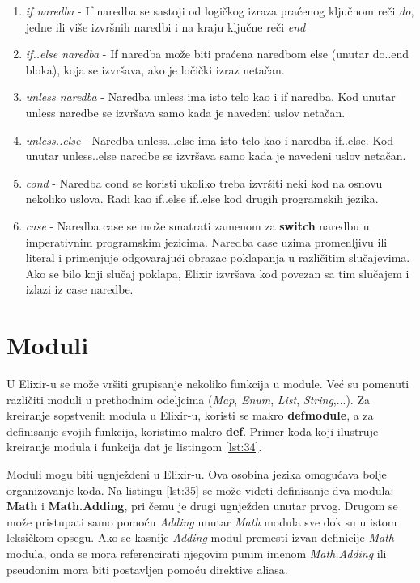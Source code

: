 \documentclass[12pt,oneside]{memoir}
\begin{document}
\begin{enumerate}
\itemsep0em 
    \item{\textit{if naredba} - If naredba se sastoji od logičkog izraza praćenog ključnom reči \textit{do}, jedne ili više izvršnih naredbi i na kraju ključne reči \textit{end}}
    \item{\textit{if..else naredba} - If naredba može biti praćena naredbom else (unutar do..end bloka), koja se izvršava, ako je ločički izraz netačan.}
    \item{\textit{unless naredba} - Naredba unless ima isto telo kao i if naredba. Kod unutar unless naredbe se izvršava samo kada je navedeni uslov netačan.}
    \item{\textit{unless..else} - Naredba unless...else ima isto telo kao i naredba if..else. Kod unutar unless..else naredbe se izvršava samo kada je navedeni uslov netačan.}
    \item{\textit{cond} - Naredba cond se koristi ukoliko treba izvršiti neki kod na osnovu nekoliko uslova. Radi kao if..else if..else kod drugih programskih jezika.}
    \item{\textit{case} - Naredba case  se može smatrati zamenom za \textbf{switch} naredbu u imperativnim programskim jezicima. Naredba case uzima promenljivu ili literal i primenjuje odgovarajući obrazac poklapanja u različitim slučajevima. Ako se bilo koji slučaj poklapa, Elixir izvršava kod povezan sa tim slučajem i izlazi iz case naredbe.}
\end{enumerate}

\section{Moduli}

U Elixir-u se može vršiti grupisanje nekoliko funkcija u module. Već su pomenuti različiti moduli u prethodnim odeljcima (\textit{Map}, \textit{Enum}, \textit{List}, \textit{String},...). Za kreiranje sopstvenih modula u Elixir-u, koristi se makro \textbf{defmodule}, a za definisanje svojih funkcija, koristimo makro \textbf{def}. Primer koda koji ilustruje kreiranje modula i funkcija dat je listingom \ref{lst:34}.



Moduli mogu biti ugnježdeni u Elixir-u. Ova osobina jezika omogućava bolje organizovanje koda. Na listingu \ref{lst:35} se može videti definisanje dva modula: \textbf{Math} i \textbf{Math.Adding}, pri čemu je drugi ugnježden unutar prvog. Drugom se može pristupati samo pomoću \textit{Adding} unutar \textit{Math} modula sve dok su u istom leksičkom opsegu. Ako se kasnije \textit{Adding} modul premesti izvan definicije \textit{Math} modula, onda se mora referencirati njegovim punim imenom \textit{Math.Adding} ili pseudonim mora biti postavljen pomoću direktive aliasa.
\end{document}
